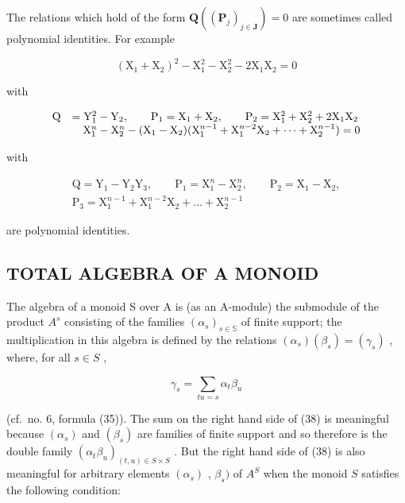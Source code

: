 The relations which hold of the form \(\mathbf{Q}((\mathbf{P}_{j})_{j\in\mathbf{J}})=0\) are sometimes called polynomial identities. For example

\[
\left(\mathrm{X} _ {1} + \mathrm{X} _ {2}\right) ^ {2} - \mathrm{X} _ {1} ^ {2} - \mathrm{X} _ {2} ^ {2} - 2 \mathrm{X} _ {1} \mathrm{X} _ {2} = 0
\]

with

\[
\begin{array}{r l} \mathrm{Q} & = \mathrm{Y} _ {1} ^ {2} - \mathrm{Y} _ {2}, \qquad \mathrm{P} _ {1} = \mathrm{X} _ {1} + \mathrm{X} _ {2}, \qquad \mathrm{P} _ {2} = \mathrm{X} _ {1} ^ {2} + \mathrm{X} _ {2} ^ {2} + 2 \mathrm{X} _ {1} \mathrm{X} _ {2} \\ & \quad \mathrm{X} _ {1} ^ {n} - \mathrm{X} _ {2} ^ {n} - (\mathrm{X} _ {1} - \mathrm{X} _ {2}) (\mathrm{X} _ {1} ^ {n - 1} + \mathrm{X} _ {1} ^ {n - 2} \mathrm{X} _ {2} + \dots + \mathrm{X} _ {2} ^ {n - 1}) = 0 \end{array}
\]

with

\[
\begin{array}{c} \mathrm{Q} = \mathrm{Y} _ {1} - \mathrm{Y} _ {2} \mathrm{Y} _ {3}, \qquad \mathrm{P} _ {1} = \mathrm{X} _ {1} ^ {n} - \mathrm{X} _ {2} ^ {n}, \qquad \mathrm{P} _ {2} = \mathrm{X} _ {1} - \mathrm{X} _ {2}, \\ \mathrm{P} _ {3} = \mathrm{X} _ {1} ^ {n - 1} + \mathrm{X} _ {1} ^ {n - 2} \mathrm{X} _ {2} + \dots + \mathrm{X} _ {2} ^ {n - 1} \end{array}
\]

are polynomial identities.

\subsection{TOTAL ALGEBRA OF A MONOID}

The algebra of a monoid S over A is (as an A-module) the submodule of the product \(A^{s}\) consisting of the families \((\alpha_{s})_{s\in\mathbb{S}}\) of finite support; the multiplication in this algebra is defined by the relations \((\alpha_{s})(\beta_{s})=(\gamma_{s})\) , where, for all \(s\in S\) ,

\[
\gamma_ {s} = \sum_ {t u = s} \alpha_ {t} \beta_ {u}\tag{38}
\]

(cf.~no. 6, formula (35)). The sum on the right hand side of (38) is meaningful because \((\alpha_{s})\) and \((\beta_{s})\) are families of finite support and so therefore is the double family \((\alpha_{t}\beta_{u})_{(t,u)\in S\times S}\) . But the right hand side of (38) is also meaningful for arbitrary elements \((\alpha_{s})\) , \(\beta_{s})\) of \(A^{S}\) when the monoid \(S\) satisfies the following condition:

